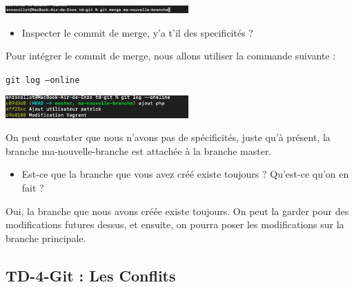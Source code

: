 \documentclass[12pt]{article}
\begin{document}
\vspace{0.3cm}

\begin{center}
  \includegraphics[width=7cm]{Image-TD-Git-3/git-merge.png}
\end{center}

\vspace{0.3cm}

\begin{itemize}
  \item Inspecter le commit de merge, y'a t'il des specificités ?
\end{itemize}

\vspace{0.3cm}

Pour intégrer le commit de merge, nous allons utiliser la commande suivante :

\texttt{git log --online}

\vspace{0.3cm}

\begin{center}
  \includegraphics[width=7cm]{Image-TD-Git-3/git-log.png}
\end{center}

\vspace{0.3cm}

On peut constater que nous n'avons pas de spécificités, juste qu'à présent, la branche ma-nouvelle-branche est attachée à la branche master.

\vspace{0.3cm}

\begin{itemize}
  \item Est-ce que la branche que vous avez créé existe toujours ? Qu'est-ce qu'on en fait ?
\end{itemize}

\vspace{0.3cm}

Oui, la branche que nous avons créée existe toujours. On peut la garder pour des modifications futures dessus, et ensuite, on pourra poser les modifications sur la branche principale.

\newpage

\subsection{TD-4-Git : Les Conflits}
\end{document}
